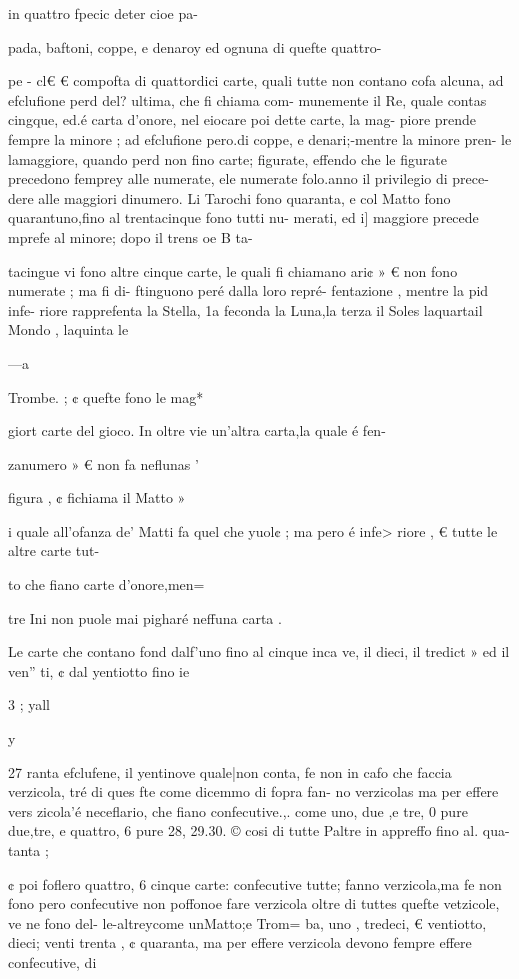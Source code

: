 {{{{{{{{{in quattro fpecic deter cioe
pa-

 
{pada, baftoni, coppe, e denaroy
ed ognuna di quefte quattro-{pe -
cl€ € compofta di quattordici
carte, quali tutte non contano
cofa alcuna, ad efclufione perd
del? ultima, che fi chiama com-
munemente il Re, quale contas
cingque, ed.é carta d’onore, nel
eiocare poi dette carte, la mag-
piore prende fempre la minore ;
ad efclufione pero.di coppe, e
denari;-mentre la minore pren-
le lamaggiore, quando perd non
fino carte; figurate, effendo che
le figurate precedono femprey
alle numerate, ele numerate
folo.anno il privilegio di prece-
dere alle maggiori dinumero.
Li Tarochi fono quaranta, e
col Matto fono quarantuno,fino
al trentacinque fono tutti nu-
merati, ed i] maggiore precede
mprefe al minore; dopo il trens
oe B ta-
 

 

 

 

 

tacingue vi fono altre cinque
carte, le quali fi chiamano ari¢ »
€ non fono numerate ; ma fi di-
ftinguono peré dalla loro repré-
fentazione , mentre la pid infe-
riore rapprefenta la Stella, 1a
feconda la Luna,la terza il Soles
laquartail Mondo , laquinta le

 

—a

Trombe. ; ¢ quefte fono le mag*

giort carte del gioco. In oltre
vie un’altra carta,la quale é fen-

zanumero » € non fa neflunas '

figura , ¢ fichiama il Matto »

i quale all’ofanza de’ Matti fa
quel che yuol¢ ; ma pero é infe>
riore , € tutte le altre carte tut-

to che fiano carte d’onore,men=

tre Ini non puole mai pigharé
neffuna carta .

Le carte che contano fond
dalf’uno fino al cinque inca
ve, il dieci, il tredict » ed il ven”
ti, ¢ dal yentiotto fino ie

3 ; yall

y
 

27
ranta efclufene, il yentinove
quale|non conta, fe non in cafo
che faccia verzicola, tré di ques
fte come dicemmo di fopra fan-
no verzicolas ma per effere vers
zicola’é neceflario, che fiano
confecutive.,. come uno, due ,e
tre, 0 pure due,tre, e quattro, 6
pure 28, 29.30. © cosi di tutte
Paltre in appreffo fino al. qua-
tanta ; {¢ poi foflero quattro, 6
cinque carte: confecutive tutte;
fanno verzicola,ma fe non fono
pero confecutive non poffonoe
fare verzicola oltre di tuttes
quefte vetzicole, ve ne fono del-
le-altreycome unMatto;e Trom=
ba, uno , tredeci, € ventiotto,
dieci; venti trenta , ¢ quaranta,
ma per effere verzicola devono
fempre effere confecutive, di

}}}}}}}}}}}}
